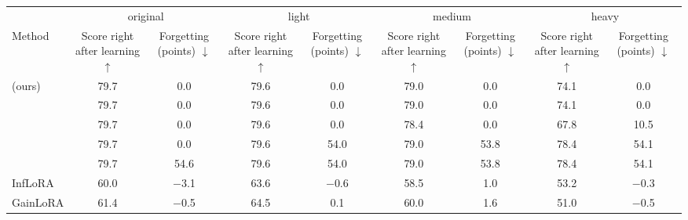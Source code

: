 \setlength{\tabcolsep}{3pt}%
\begin{tabular}{lcccccccc}
    \toprule
    & \multicolumn{2}{c}{original} & \multicolumn{2}{c}{light} & \multicolumn{2}{c}{medium} & \multicolumn{2}{c}{heavy} \\
    \cmidrule(lr){2-3} \cmidrule(lr){4-5} \cmidrule(lr){6-7} \cmidrule(lr){8-9}
    Method & \shortstack[c]{Score\\right\\after\\learning\\$\uparrow$} & \shortstack[c]{Forgetting\\(points)\\$\downarrow$} & \shortstack[c]{Score\\right\\after\\learning\\$\uparrow$} & \shortstack[c]{Forgetting\\(points)\\$\downarrow$} & \shortstack[c]{Score\\right\\after\\learning\\$\uparrow$} & \shortstack[c]{Forgetting\\(points)\\$\downarrow$} & \shortstack[c]{Score\\right\\after\\learning\\$\uparrow$} & \shortstack[c]{Forgetting\\(points)\\$\downarrow$} \\
    \midrule
    \cert{} (ours) & 79.7 & 0.0 & 79.6 & 0.0 & 79.0 & 0.0 & 74.1 & 0.0 \\
    \nearest{} & 79.7 & 0.0 & 79.6 & 0.0 & 79.0 & 0.0 & 74.1 & 0.0 \\
    \centre{} & 79.7 & 0.0 & 79.6 & 0.0 & 78.4 & 0.0 & 67.8 & 10.5 \\
    \keyswitch{} & 79.7 & 0.0 & 79.6 & 54.0 & 79.0 & 53.8 & 78.4 & 54.1 \\
    \plain{} & 79.7 & 54.6 & 79.6 & 54.0 & 79.0 & 53.8 & 78.4 & 54.1 \\
    InfLoRA & 60.0 & $-$3.1 & 63.6 & $-$0.6 & 58.5 & 1.0 & 53.2 & $-$0.3 \\
    GainLoRA & 61.4 & $-$0.5 & 64.5 & 0.1 & 60.0 & 1.6 & 51.0 & $-$0.5 \\
    \bottomrule
\end{tabular}
